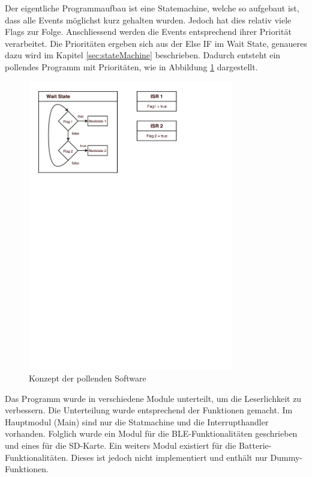 Der eigentliche Programmaufbau ist eine Statemachine, welche so aufgebaut ist, dass alle Events möglichst kurz gehalten wurden. Jedoch hat dies relativ viele Flags zur Folge. Anschliessend werden die Events entsprechend ihrer Priorität verarbeitet. Die Prioritäten ergeben sich aus der Else IF im Wait State, genaueres dazu wird im Kapitel \ref{sec:stateMachine} beschrieben. Dadurch entsteht ein pollendes Programm mit Prioritäten, wie in Abbildung \ref{fig:Software_approach} dargestellt.

\begin{figure}[htbp!!!!]
	\centering
	\includegraphics[width=0.8\textwidth]{Data/Software_Pollend}
	\caption[Software:Pollend]{Konzept der pollenden Software}
	\label{fig:Software_approach}
\end{figure}

Das Programm wurde in verschiedene Module unterteilt, um die Leserlichkeit zu verbessern. Die Unterteilung wurde entsprechend der Funktionen gemacht. Im Hauptmodul (Main) sind nur die Statmachine und die Interrupthandler vorhanden. Folglich wurde ein Modul für die BLE-Funktionalitäten geschrieben und eines für die SD-Karte. Ein weiters Modul existiert für die Batterie-Funktionalitäten. Dieses ist jedoch nicht implementiert und enthält nur Dummy-Funktionen.







